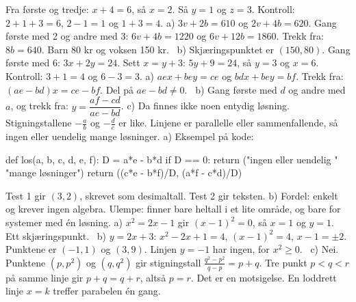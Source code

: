  Fra første og tredje: $x + 4 = 6$, så $x = 2$. Så $y = 1$ og $z = 3$. Kontroll: $2 + 1 + 3 = 6$, $2 - 1 = 1$ og $1 + 3 = 4$.
 a) $3v + 2b = 610$ og $2v + 4b = 620$. Gang første med 2 og andre med 3: $6v + 4b = 1220$ og $6v + 12b = 1860$. Trekk fra: $8b = 640$. Barn 80 kr og voksen 150 kr. \ b) Skjæringspunktet er $(150, 80)$.
 Gang første med 6: $3x + 2y = 24$. Sett $x = y + 3$: $5y + 9 = 24$, så $y = 3$ og $x = 6$. Kontroll: $3 + 1 = 4$ og $6 - 3 = 3$.
 a) $aex + bey = ce$ og $bdx + bey = bf$. Trekk fra: $(ae - bd)x = ce - bf$. Del på $ae - bd \neq 0$. \ b) Gang første med $d$ og andre med $a$, og trekk fra: $y = \dfrac{af - cd}{ae - bd}$.
c) Da finnes ikke noen entydig løsning. Stigningstallene $-\frac{a}{b}$ og $-\frac{d}{e}$ er like. Linjene er parallelle eller sammenfallende, så ingen eller uendelig mange løsninger.
 a) Eksempel på kode:
\begin{minipage}{\linewidth}
\begin{kode}
def los(a, b, c, d, e, f):
    D = a*e - b*d
    if D == 0:
        return ("ingen eller uendelig "
                "mange løsninger")
    return ((c*e - b*f)/D, (a*f - c*d)/D)
\end{kode}
\end{minipage}
Test 1 gir $(3, 2)$, skrevet som desimaltall. Test 2 gir teksten. b) Fordel: enkelt og krever ingen algebra. Ulempe: finner bare heltall i et lite område, og bare for systemer med én løsning.
 a) $x^2 = 2x - 1$ gir $(x - 1)^2 = 0$, så $x = 1$ og $y = 1$. Ett skjæringspunkt. \ b) $y = 2x + 3$: $x^2 - 2x + 1 = 4$, $(x - 1)^2 = 4$, $x - 1 = \pm 2$. Punktene er $(-1, 1)$ og $(3, 9)$. Linjen $y = -1$ har ingen, for $x^2 \ge 0$. \ c) Nei. Punktene $(p, p^2)$ og $(q, q^2)$ gir stigningstall $\frac{q^2 - p^2}{q - p} = p + q$. Tre punkt $p < q < r$ på samme linje gir $p + q = q + r$, altså $p = r$. Det er en motsigelse. En loddrett linje $x = k$ treffer parabelen én gang.
